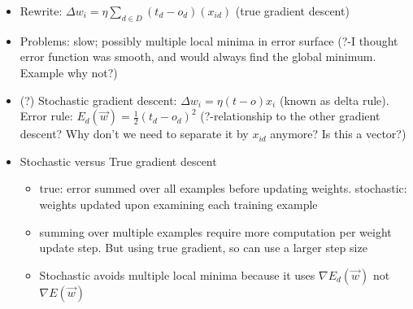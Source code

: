 \documentclass[11pt]{article}
\begin{document}
\begin{itemize}
\begin{itemize}
\item Rewrite: $\Delta w_i = \eta \sum_{d\in D} (t_d - o_d) (x_{id})$ (true gradient descent)
\item Problems: slow; possibly multiple local minima in error surface (?-I thought error function was smooth, and would always find the global minimum. Example why not?)
\item (?) Stochastic gradient descent: $\Delta w_i = \eta (t-o)x_i$ (known as delta rule). Error rule: $E_d(\vec{w}) = \frac{1}{2} (t_d - o_d)^2$ (?-relationship to the other gradient descent? Why don't we need to separate it by $x_{id}$ anymore? Is this a vector?)
\item Stochastic versus True gradient descent
\begin{itemize}
\item true: error summed over all examples before updating weights. stochastic: weights updated upon examining each training example
\item summing over multiple examples require more computation per weight update step. But using true gradient, so can use a larger step size
\item Stochastic avoids multiple local minima because it uses $\nabla E_d(\vec{w})$ not $\nabla E(\vec{w})$
\end{itemize}
\end{itemize}
\end{itemize}
\end{document}
